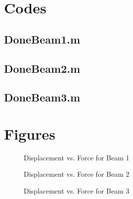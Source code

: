 \documentclass{article}
\begin{document}
\appendix
\section{Codes}
\subsection{DoneBeam1.m}
\pagebreak 
\subsection{DoneBeam2.m}
\pagebreak 
\subsection{DoneBeam3.m}
\pagebreak  %

\section{Figures}
\begin{figure}[htb]
\begin{center}
\caption{Displacement vs. Force for Beam 1}
\end{center}
\end{figure}

\begin{figure}[htb]
\begin{center}
\caption{Displacement vs. Force for Beam 2}
\end{center}
\end{figure}

\begin{figure}[htb]
\begin{center}
\caption{Displacement vs. Force for Beam 3}
\end{center}
\end{figure}
\end{document}
